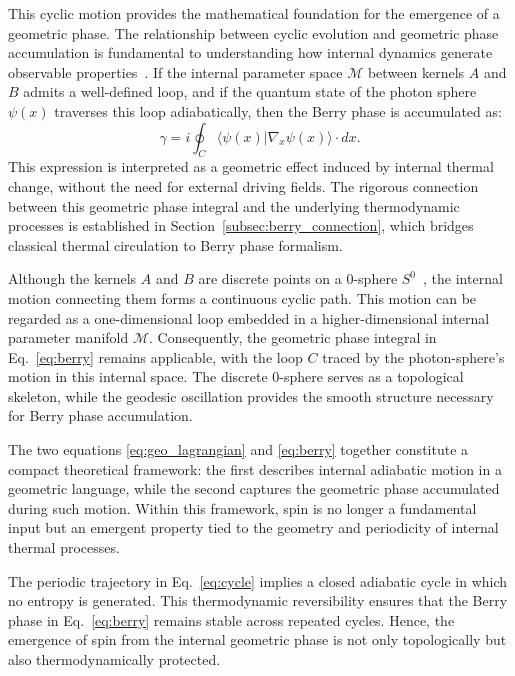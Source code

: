 \documentclass[%
 reprint,
 amsmath,amssymb,
 aps,
]{revtex4-1}
\numberwithin{equation}{section}%
\begin{document}
This cyclic motion provides the mathematical foundation for the emergence of a geometric phase. The relationship between cyclic evolution and geometric phase accumulation is fundamental to understanding how internal dynamics generate observable properties~\cite{anandan1992geometric}. If the internal parameter space $\mathcal{M}$ between kernels $A$ and $B$ admits a well-defined loop, and if the quantum state of the photon sphere $\psi(x)$ traverses this loop adiabatically, then the Berry phase is accumulated as:
\begin{equation}
\gamma = i \oint_C \langle \psi(x) | \nabla_x \psi(x) \rangle \cdot dx. \label{eq:berry}
\end{equation}
This expression is interpreted as a geometric effect induced by internal thermal change, without the need for external driving fields. The rigorous connection between this geometric phase integral and the underlying thermodynamic processes is established in Section~\ref{subsec:berry_connection}, which bridges classical thermal circulation to Berry phase formalism.

Although the kernels $A$ and $B$ are discrete points on a 0-sphere $S^0$~\cite{hanamura1811.0312,hanamura2501.0130}, the internal motion connecting them forms a continuous cyclic path. This motion can be regarded as a one-dimensional loop embedded in a higher-dimensional internal parameter manifold $\mathcal{M}$. Consequently, the geometric phase integral in Eq.~\eqref{eq:berry} remains applicable, with the loop $C$ traced by the photon-sphere's motion in this internal space. The discrete 0-sphere serves as a topological skeleton, while the geodesic oscillation provides the smooth structure necessary for Berry phase accumulation.

The two equations \eqref{eq:geo_lagrangian} and \eqref{eq:berry} together constitute a compact theoretical framework: the first describes internal adiabatic motion in a geometric language, while the second captures the geometric phase accumulated during such motion. Within this framework, spin is no longer a fundamental input but an emergent property tied to the geometry and periodicity of internal thermal processes.

The periodic trajectory in Eq.~\eqref{eq:cycle} implies a closed adiabatic cycle in which no entropy is generated. This thermodynamic reversibility ensures that the Berry phase in Eq.~\eqref{eq:berry} remains stable across repeated cycles. Hence, the emergence of spin from the internal geometric phase is not only topologically but also thermodynamically protected.
\end{document}
